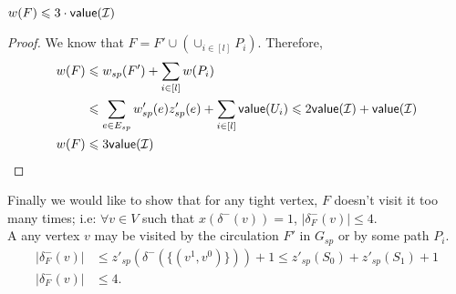\documentclass[./main.tex]{subfiles}
\begin{document}
		\begin{claim}
			$w(F) \leqslant 3\cdot\textsf{\textup{value}}(\mathcal{I})$
		\end{claim}
		\begin{proof}
			We know that $F = F' \cup (\cup_{i \in [l]} P_i)$. Therefore,
			\begin{align*}
				w(F) &\leqslant w_{sp}(F') + \sum_{i \in [l]} w(P_i)\\
				&\leqslant \sum_{e \in E_{sp}} w'_{sp}(e)z'_{sp}(e) + \sum_{i \in [l]} \textsf{\textup{value}}(U_i) \leqslant 2\textsf{\textup{value}}(\mathcal{I}) + \textsf{\textup{value}}(\mathcal{I})\\
				w(F) &\leqslant 3\textsf{\textup{value}}(\mathcal{I})
			\end{align*}
		\end{proof}
		Finally we would like to show that for any tight vertex, $F$ doesn't visit it too many times; i.e: $\forall v \in V$ such that $x(\delta^-(v)) = 1$, $|\delta^-_F(v)| \leqslant 4$.\\
		A any vertex $v$ may be visited by the circulation $F'$ in $G_{sp}$ or by some path $P_i$.
		\begin{align*}
			|\delta^-_F(v)| &\leqslant z'_{sp}(\delta^-(\{(v^1, v^0)\})) + 1 \leqslant z'_{sp}(S_0) + z'_{sp}(S_1) + 1\\
			|\delta^-_F(v)| &\leqslant 4.
		\end{align*}
\end{document}
